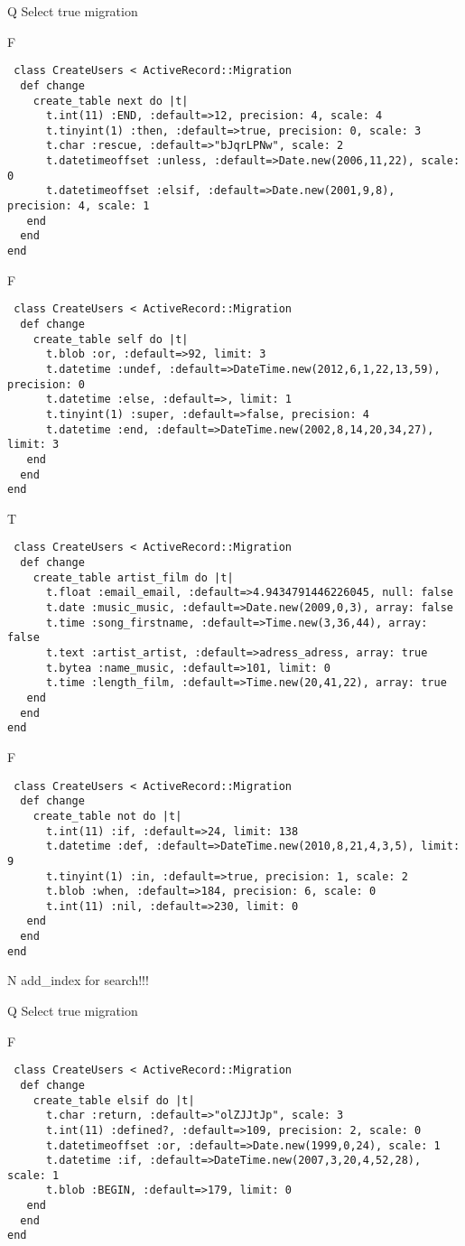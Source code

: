 Q
Select true migration

F
\begin{verbatim}
 class CreateUsers < ActiveRecord::Migration 
  def change 
    create_table next do |t| 
      t.int(11) :END, :default=>12, precision: 4, scale: 4
      t.tinyint(1) :then, :default=>true, precision: 0, scale: 3
      t.char :rescue, :default=>"bJqrLPNw", scale: 2
      t.datetimeoffset :unless, :default=>Date.new(2006,11,22), scale: 0
      t.datetimeoffset :elsif, :default=>Date.new(2001,9,8), precision: 4, scale: 1
   end 
  end 
end
\end{verbatim}

F
\begin{verbatim}
 class CreateUsers < ActiveRecord::Migration 
  def change 
    create_table self do |t| 
      t.blob :or, :default=>92, limit: 3
      t.datetime :undef, :default=>DateTime.new(2012,6,1,22,13,59), precision: 0
      t.datetime :else, :default=>, limit: 1
      t.tinyint(1) :super, :default=>false, precision: 4
      t.datetime :end, :default=>DateTime.new(2002,8,14,20,34,27), limit: 3
   end 
  end 
end
\end{verbatim}

T
\begin{verbatim}
 class CreateUsers < ActiveRecord::Migration 
  def change 
    create_table artist_film do |t| 
      t.float :email_email, :default=>4.9434791446226045, null: false
      t.date :music_music, :default=>Date.new(2009,0,3), array: false
      t.time :song_firstname, :default=>Time.new(3,36,44), array: false
      t.text :artist_artist, :default=>adress_adress, array: true
      t.bytea :name_music, :default=>101, limit: 0
      t.time :length_film, :default=>Time.new(20,41,22), array: true
   end 
  end 
end
\end{verbatim}

F
\begin{verbatim}
 class CreateUsers < ActiveRecord::Migration 
  def change 
    create_table not do |t| 
      t.int(11) :if, :default=>24, limit: 138
      t.datetime :def, :default=>DateTime.new(2010,8,21,4,3,5), limit: 9
      t.tinyint(1) :in, :default=>true, precision: 1, scale: 2
      t.blob :when, :default=>184, precision: 6, scale: 0
      t.int(11) :nil, :default=>230, limit: 0
   end 
  end 
end
\end{verbatim}
N
add_index for search!!!
  
Q
Select true migration

F
\begin{verbatim}
 class CreateUsers < ActiveRecord::Migration 
  def change 
    create_table elsif do |t| 
      t.char :return, :default=>"olZJJtJp", scale: 3
      t.int(11) :defined?, :default=>109, precision: 2, scale: 0
      t.datetimeoffset :or, :default=>Date.new(1999,0,24), scale: 1
      t.datetime :if, :default=>DateTime.new(2007,3,20,4,52,28), scale: 1
      t.blob :BEGIN, :default=>179, limit: 0
   end 
  end 
end
\end{verbatim}

